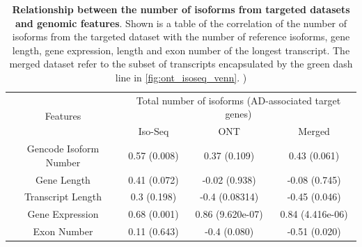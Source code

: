 \begin{table}[!hp]
	\centering
	\captionsetup{width=0.95\textwidth}
	\caption[Relationship between the number of isoforms from targeted datasets and genomic features]%
	{\textbf{Relationship between the number of isoforms from targeted datasets and genomic features}. Shown is a table of the correlation of the number of isoforms from the targeted dataset with the number of reference isoforms, gene length, gene expression, length and exon number of the longest transcript. The merged dataset refer to the subset of transcripts encapsulated by the green dash line in \cref{fig:ont_isoseq_venn}. )}
	\label{tab:isoformnum_corr}	
	\begin{tabular}{cccc}
		\hline
		\multirow{2}{*}{Features} & \multicolumn{3}{c}{Total number of isoforms (AD-associated target genes)} \\ \cline{2-4} 
		& Iso-Seq & ONT & Merged \\ \cline{1-4} 
		Gencode Isoform Number & 0.57 (0.008) & 0.37 (0.109)     & 0.43 (0.061)     \\
		Gene Length            & 0.41 (0.072) & -0.02 (0.938)    & -0.08 (0.745)    \\
		Transcript Length      & 0.3 (0.198)  & -0.4 (0.08314)   & -0.45 (0.046)    \\
		Gene Expression        & 0.68 (0.001) & 0.86 (9.620e-07) & 0.84 (4.416e-06) \\
		Exon Number            & 0.11 (0.643) & -0.4 (0.080)     & -0.51 (0.020)    \\ \hline
	\end{tabular}
\end{table}

\clearpage
